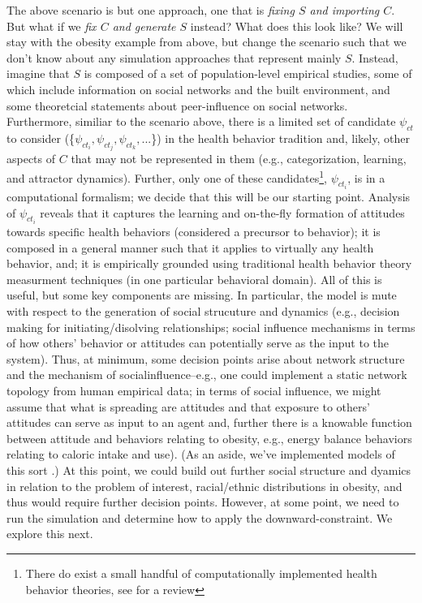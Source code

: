 \documentclass{article}
\begin{document}
The above scenario is but one approach, one that is \textit{fixing $S$ and importing $C$}.  But what if we \textit{fix $C$ and generate $S$} instead?  What does this look like?  We will stay with the obesity example from above, but change the scenario such that we don't know about any simulation approaches that represent mainly $S$.  Instead, imagine that $S$ is composed of a set of population-level empirical studies, some of which include information on social networks and the built environment, and some theoretcial statements about peer-influence on social networks. Furthermore, similiar to the scenario above, there is a limited set of candidate $\psi_{ct}$ to consider (\{$\psi_{ct_i}, \psi_{ct_j}, \psi_{ct_k},...$\}) in the health behavior tradition and, likely, other aspects of $C$ that may not be represented in them (e.g., categorization, learning, and attractor dynamics).  Further, only one of these candidates\footnote{There do exist a small handful of computationally implemented health behavior theories, see\cite{orr2017readbook; orr2017galeabook} for a review}, $\psi_{ct_i}$, is in a computational formalism; we decide that this will be our starting point.  Analysis of $\psi_{ct_i}$ reveals that it captures the learning and on-the-fly formation of attitudes towards specific health behaviors (considered a precursor to behavior); it is composed in a general manner such that it applies to virtually any health behavior, and; it is empirically grounded using traditional health behavior theory measurment techniques (in one particular behavioral domain). All of this is useful, but some key components are missing.  In particular, the model is mute with respect to the generation of social strucuture and dynamics (e.g., decision making for initiating/disolving relationships; social influence mechanisms in terms of how others' behavior or attitudes can potentially serve as the input to the system).  Thus, at minimum, some decision points arise about network structure and the mechanism of socialinfluence--e.g., one could implement a static network topology from human empirical data; in terms of social influence, we might assume that what is spreading are attitudes and that exposure to others' attitudes can serve as input to an agent and, further there is a knowable function between attitude and behaviors relating to obesity, e.g., energy balance behaviors relating to caloric intake and use). (As an aside, we've implemented models of this sort \cite{orr2017readbook orr2017galeabook}.)  At this point, we could build out further social structure and dyamics in relation to the problem of interest, racial/ethnic distributions in obesity, and thus would require further decision points.  However, at some point, we need to run the simulation and determine how to apply the downward-constraint. We explore this next.
\end{document}
